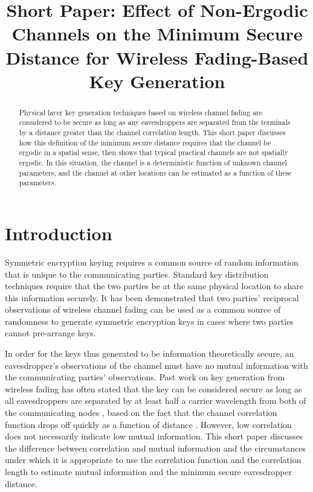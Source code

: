 \documentclass[conference]{ieeetran}
\author{\IEEEauthorblockN{K.~C.~Kerby-Patel}
\IEEEauthorblockA{Engineering Department\\
University of Massachusetts Boston\\
Boston, MA 02125\\
kc.kerby-patel@umb.edu}
}
\title{Short Paper: Effect of Non-Ergodic Channels on the Minimum Secure Distance for Wireless Fading-Based Key Generation}
\begin{document}
\maketitle

\begin{abstract}
Physical layer key generation techniques based on wireless channel fading are considered to be secure as long as any eavesdroppers are separated from the terminals by a distance greater than the channel correlation length.  This short paper discusses how this definition of the minimum secure distance requires that the channel be ergodic in a spatial sense, then shows that typical practical channels are not spatially ergodic.  In this situation, the channel   is a deterministic function of unknown channel parameters, and the channel at other locations can be estimated as a function of these parameters.
\end{abstract}
\section{Introduction}
Symmetric encryption keying requires a common source of random information that is unique to the communicating parties. Standard key distribution techniques require that the two parties be at the same physical location to share this information securely.  
It has been demonstrated \cite{azimisadjadi2007, bloch2008, mathur2008, ye2010} that two parties' reciprocal observations of wireless channel fading can be used as a common source of randomness to generate symmetric encryption keys in cases where two parties cannot pre-arrange keys.  

In order for the keys thus generated to be information theoretically secure, an eavesdropper's observations of the channel must have no mutual information with the communicating parties' observations.  Past work on key generation from wireless fading has often stated that the key can be considered secure as long as all eavesdroppers are separated by at least half a carrier wavelength from both of the communicating nodes \cite{azimisadjadi2007, bloch2008, mathur2008, ye2010}, based on the fact that the channel correlation function drops off quickly as a function of distance \cite{jakes1974}.  However, low correlation does not necessarily indicate low mutual information.  This short paper discusses the difference between correlation and mutual information and the circumstances under which it is appropriate to use the correlation function and the correlation length to estimate mutual information and the minimum secure eavesdropper distance.
\end{document}
